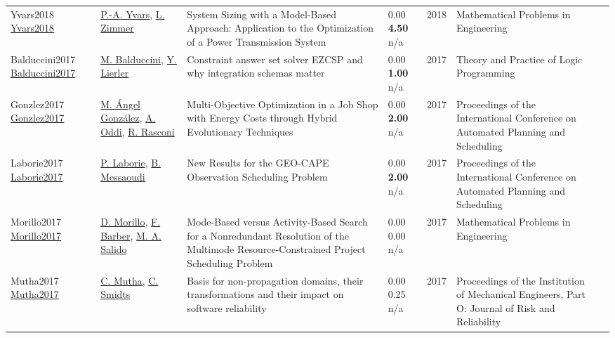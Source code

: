 {\begin{longtable}{p{3cm}p{5cm}p{10cm}p{1cm}rp{2.5cm}l}
Yvars2018 \href{http://dx.doi.org/10.1155/2018/6861429}{Yvars2018} & \hyperref[auth:a1979]{P.-A. Yvars}, \hyperref[auth:a1980]{L. Zimmer} & \cellcolor{gold!20}System Sizing with a Model-Based Approach: Application to the Optimization of a Power Transmission System & \noindent{}\textcolor{black!50}{0.00} \textbf{4.50} n/a & 2018 & Mathematical Problems in Engineering & \cite{Yvars2018}\\
Balduccini2017 \href{http://dx.doi.org/10.1017/s1471068417000102}{Balduccini2017} & \hyperref[auth:a1042]{M. Balduccini}, \hyperref[auth:a2051]{Y. Lierler} & \cellcolor{green!10}Constraint answer set solver EZCSP and why integration schemas matter & \noindent{}\textcolor{black!50}{0.00} \textbf{1.00} n/a & 2017 & Theory and Practice of Logic Programming & \cite{Balduccini2017}\\
Gonzlez2017 \href{http://dx.doi.org/10.1609/icaps.v27i1.13809}{Gonzlez2017} & \hyperref[auth:a1828]{M. Ángel González}, \hyperref[auth:a282]{A. Oddi}, \hyperref[auth:a1270]{R. Rasconi} & Multi-Objective Optimization in a Job Shop with Energy Costs through Hybrid Evolutionary Techniques & \noindent{}\textcolor{black!50}{0.00} \textbf{2.00} n/a & 2017 & Proceedings of the International Conference on Automated Planning and Scheduling & \cite{Gonzlez2017}\\
Laborie2017 \href{http://dx.doi.org/10.1609/icaps.v27i1.13844}{Laborie2017} & \hyperref[auth:a118]{P. Laborie}, \hyperref[auth:a1550]{B. Messaoudi} & New Results for the GEO-CAPE Observation Scheduling Problem & \noindent{}\textcolor{black!50}{0.00} \textbf{2.00} n/a & 2017 & Proceedings of the International Conference on Automated Planning and Scheduling & \cite{Laborie2017}\\
Morillo2017 \href{http://dx.doi.org/10.1155/2017/4627856}{Morillo2017} & \hyperref[auth:a1735]{D. Morillo}, \hyperref[auth:a271]{F. Barber}, \hyperref[auth:a153]{M. A. Salido} & \cellcolor{gold!20}Mode-Based versus Activity-Based Search for a Nonredundant Resolution of the Multimode Resource-Constrained Project Scheduling Problem & \noindent{}\textcolor{black!50}{0.00} \textcolor{black!50}{0.00} n/a & 2017 & Mathematical Problems in Engineering & \cite{Morillo2017}\\
Mutha2017 \href{http://dx.doi.org/10.1177/1748006x17744380}{Mutha2017} & \hyperref[auth:a1957]{C. Mutha}, \hyperref[auth:a1958]{C. Smidts} & Basis for non-propagation domains, their transformations and their impact on software reliability & \noindent{}\textcolor{black!50}{0.00} 0.25 n/a & 2017 & Proceedings of the Institution of Mechanical Engineers, Part O: Journal of Risk and Reliability & \cite{Mutha2017}\\

\end{longtable}}
